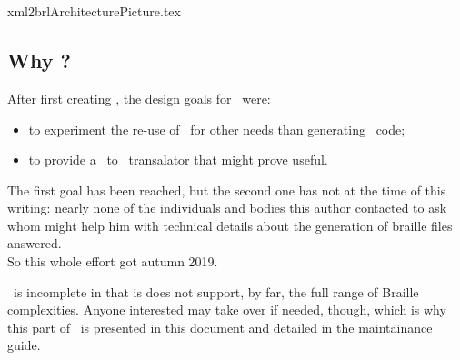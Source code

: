 



\chapter{\xmlToBrl\ }

{xml2brlArchitecturePicture.tex}


\section{Why \xmlToBrl?}

After first creating \xmlToLy, the design goals for \xmlToBrl\ were:
\begin{itemize}
\item to experiment the re-use of \msrRepr\ for other needs than generating \lily\ code;
\item to provide a \mxml\ to \braille\ transalator that might prove useful.
\end{itemize}

The first goal has been reached, but the second one has not at the time of this writing: nearly none of the individuals and bodies this author contacted to ask whom might help him with technical details about the generation of braille files answered.\\
So this whole effort got \frozen\in autumn 2019.

\xmlToBrl\ is incomplete in that is does not support, by far, the full range of Braille complexities. Anyone interested may take over if needed, though, which is why this part of \mf\ is presented in this document and detailed in the maintainance guide.


